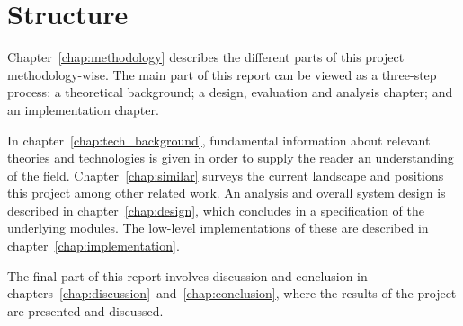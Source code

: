 \section{Structure}
  \label{sec:structure}

Chapter~\ref{chap:methodology} describes the different parts of this project methodology-wise. The main part of this report can be viewed as a three-step process: a theoretical background; a design, evaluation and analysis chapter; and an implementation chapter.

In chapter~\ref{chap:tech_background}, fundamental information about relevant theories and technologies is given in order to supply the reader an understanding of the field. Chapter~\ref{chap:similar} surveys the current landscape and positions this project among other related work. An analysis and overall system design is described in chapter~\ref{chap:design}, which concludes in a specification of the underlying modules. The low-level implementations of these are described in chapter~\ref{chap:implementation}.

The final part of this report involves discussion and conclusion in chapters~\ref{chap:discussion}~and~\ref{chap:conclusion}, where the results of the project are presented and discussed.
